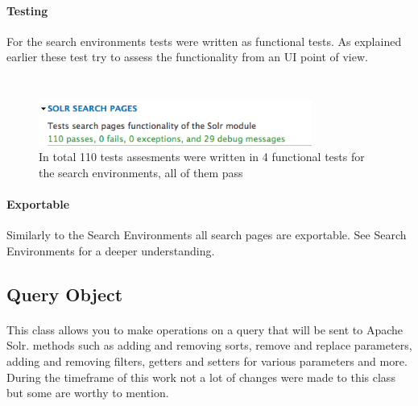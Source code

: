 \inputminted[fontsize=\scriptsize,linenos]{php}{./code_examples/functions_search_pages.php}

\paragraph{Testing}
For the search environments tests were written as functional tests. As explained earlier these test try to assess the functionality from an UI point of view.
\inputminted[fontsize=\scriptsize,linenos]{php}{./code_examples/testEditSearchPages.php}

\inputminted[fontsize=\scriptsize,linenos]{php}{./code_examples/test_signature_search_pages.php}

\begin{figure}[H]
     \includegraphics[width=0.8\textwidth]{images/implementation/test_search_pages.png}
     \caption{In total 110 tests assesments were written in 4 functional tests for the search environments, all of them pass}
\end{figure}

\paragraph{Exportable}
Similarly to the Search Environments all search pages are exportable. See Search Environments for a deeper understanding.

\subsection{Query Object}
\paragraph{} This class allows you to make operations on a query that will be sent to Apache Solr. methods such as adding and removing sorts, remove and replace parameters, adding and removing filters, getters and setters for various parameters and more. During the timeframe of this work not a lot of changes were made to this class but some are worthy to mention.

